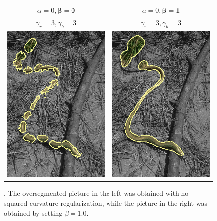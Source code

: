 \begin{figure}
\center
\begin{tabular}{cc}
$\alpha=0, \boldsymbol{\beta=0}$ & $\alpha=0, \boldsymbol{\beta=1}$\\
$\gamma_r = 3, \gamma_b = 3$ & $\gamma_r = 3, \gamma_b = 3$\\
 	\includegraphics[scale=0.25]{figures/chapter8/completion/graphseg/alpha-0.0/beta-0.0/gamma-3.0/radius-7/corrected-seg.png} & 
 	\includegraphics[scale=0.25]{figures/chapter8/completion/graphseg/alpha-0.0/beta-1.0/gamma-3.0/radius-7/corrected-seg.png}
\end{tabular}	
\caption{. The oversegmented picture in the left was obtained with no squared curvature regularization, while the picture in the right was obtained by setting $\beta=1.0$. }
\label{ch8:fig:segmentation-curvature-completion}
\end{figure}

